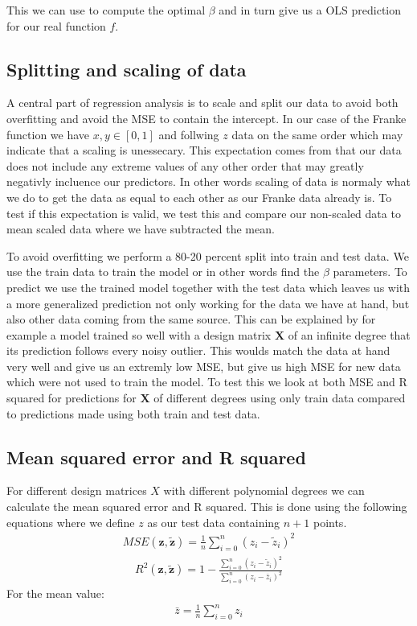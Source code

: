 \documentclass[12pt]{article}
\begin{document}
This we can use to compute the optimal $\beta$ and in turn give us a OLS prediction for our real function $f$.

\subsection{Splitting and scaling of data}
A central part of regression analysis is to scale and split our data to avoid both overfitting and avoid the MSE to contain the intercept. In our case of the Franke function we have $x,y \in [0,1]$ and follwing $z$ data on the same order which may indicate that a scaling is unessecary. This expectation comes from that our data does not include any extreme values of any other order that may greatly negativly incluence our predictors. In other words scaling of data is normaly what we do to get the data as equal to each other as our Franke data already is. To test if this expectation is valid, we test this and compare our non-scaled data to mean scaled data where we have subtracted the mean.

To avoid overfitting we perform a 80-20 percent split into train and test data. We use the train data to train the model or in other words find the $\beta$ parameters. To predict we use the trained model together with the test data which leaves us with a more generalized prediction not only working for the data we have at hand, but also other data coming from the same source. This can be explained by for example a model trained so well with a design matrix $\boldsymbol{X}$ of an infinite degree that its prediction follows every noisy outlier. This woulds match the data at hand very well and give us an extremly low MSE, but give us high MSE for new data which were not used to train the model. To test this we look at both MSE and R squared for predictions for $\boldsymbol{X}$ of different degrees using only train data compared to predictions made using both train and test data.

\subsection{Mean squared error and R squared}
For different design matrices $X$ with different polynomial degrees we can calculate the mean squared error and R squared. This is done using the following equations where we define $z$ as our test data containing $n+1$ points.
\begin{align*}
  MSE(\boldsymbol{z}, \boldsymbol{\tilde{z}}) = \frac{1}{n }\sum_{i=0}^{n}(z_i- \tilde{z}_i)^2
\end{align*}
\begin{align*}
  R^2(\boldsymbol{z}, \boldsymbol{\tilde{z}}) = 1 - \frac{\sum_{i=0}^{n}(z_i- \tilde{z}_i)^2}{\sum_{i=0}^{n}(z_i- \bar{z}_i)^2}
\end{align*}
For the mean value:
\begin{align*}
  \bar{z} = \frac{1}{n }\sum_{i=0}^{n}z_i
\end{align*}
\end{document}
